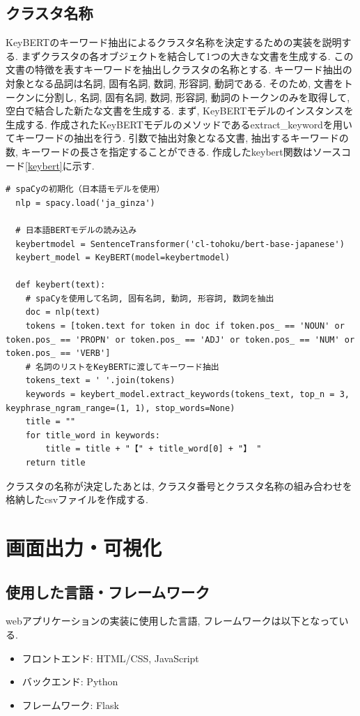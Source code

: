 \subsection{クラスタ名称}
KeyBERTのキーワード抽出によるクラスタ名称を決定するための実装を説明する. まずクラスタの各オブジェクトを結合して1つの大きな文書を生成する. この文書の特徴を表すキーワードを抽出しクラスタの名称とする. キーワード抽出の対象となる品詞は名詞, 固有名詞, 数詞, 形容詞, 動詞である. 
そのため, 文書をトークンに分割し, 名詞, 固有名詞, 数詞, 形容詞, 動詞のトークンのみを取得して, 空白で結合した新たな文書を生成する. 
まず, KeyBERTモデルのインスタンスを生成する. 作成されたKeyBERTモデルのメソッドであるextract\_keywordを用いてキーワードの抽出を行う. 引数で抽出対象となる文書, 抽出するキーワードの数, キーワードの長さを指定することができる. 
作成したkeybert関数はソースコード\ref{keybert}に示す. 

\begin{lstlisting}[caption=clustering.py, label=keybert]
  # spaCyの初期化（日本語モデルを使用）
  nlp = spacy.load('ja_ginza')

  # 日本語BERTモデルの読み込み
  keybertmodel = SentenceTransformer('cl-tohoku/bert-base-japanese')
  keybert_model = KeyBERT(model=keybertmodel)

  def keybert(text):
    # spaCyを使用して名詞, 固有名詞, 動詞, 形容詞, 数詞を抽出
    doc = nlp(text)
    tokens = [token.text for token in doc if token.pos_ == 'NOUN' or token.pos_ == 'PROPN' or token.pos_ == 'ADJ' or token.pos_ == 'NUM' or token.pos_ == 'VERB']
    # 名詞のリストをKeyBERTに渡してキーワード抽出
    tokens_text = ' '.join(tokens)
    keywords = keybert_model.extract_keywords(tokens_text, top_n = 3, keyphrase_ngram_range=(1, 1), stop_words=None)
    title = ""
    for title_word in keywords:
        title = title + "【" + title_word[0] + "】 "
    return title
\end{lstlisting}

クラスタの名称が決定したあとは, クラスタ番号とクラスタ名称の組み合わせを格納したcsvファイルを作成する. 


\section{画面出力・可視化}
\subsection{使用した言語・フレームワーク}
webアプリケーションの実装に使用した言語, フレームワークは以下となっている. 
\begin{itemize}
    \item フロントエンド: HTML/CSS, JavaScript
    \item バックエンド: Python
    \item フレームワーク: Flask
\end{itemize}

